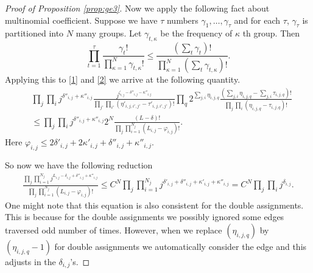 \documentclass[12pt]{article}
\numberwithin{equation}{section}
\numberwithin{equation}{section}
\theoremstyle{definition}
\renewcommand{\1}{\bf 1}
\begin{document}
\begin{proof}[Proof of Proposition \ref{prop:ge3}]
Now we apply the following fact about multinomial coefficient. Suppose we have $\tau$ numbers $\gamma_{1},\ldots, \gamma_{\tau}$ and for each $\tau$, $\gamma_{\tau}$ is partitioned into $N$ many groups. Let $\gamma_{t,\kappa}$ be the frequency of $\kappa$ th group. Then 
\begin{equation}
\prod_{t=1}^{\tau}\frac{\gamma_{t}!}{\prod_{\kappa=1}^{N}\gamma_{t,\kappa}!}\le \frac{\left(\sum_{t}\gamma_{t}\right)!}{\prod_{\kappa=1}^{N}(\sum_{t}\gamma_{t,\kappa})!}.
\end{equation} 
Applying this to \eqref{1} and \eqref{2} we arrive at the following quantity.
\begin{equation}
\begin{split}
&\prod_{j}\prod_{i}j^{\delta''_{i,j}+\kappa''_{i,j}}\frac{j^{\zeta_{i,j}-\delta''_{i,j}-\kappa''_{i,j}}}{\prod_{j'}\prod_{i'} \left(\eta'_{i,j,i',j'}-\tau'_{i,j,i',j'}\right)!}\prod_{q}2^{\sum_{j,i}\eta_{i,j,q}} \frac{(\sum_{j,i}\eta_{i,j,q}-\sum_{j,i}\tau_{i,j,q})!}{\prod_{j}\prod_{i}\left(\eta_{i,j,q}-\tau_{i,j,q}\right)!}\\
& \le \prod_{j}\prod_{i} j^{\delta''_{i,j}+\kappa''_{i,j}} 2^{N} \frac{(L-\delta)!}{\prod_{j}\prod_{i=1}^{N_{j}}(L_{i,j}-\varphi_{i,j})!}.
\end{split}
\end{equation}
Here $\varphi_{i,j}\le 2\delta'_{i,j}+ 2\kappa'_{i,j}+ \delta''_{i,j}+\kappa''_{i,j}$.

So now we have the following reduction
\begin{equation}
\begin{split}
\frac{\prod_{j}\prod_{i=1}^{N_{j}} j^{L_{i,j}-\delta_{i,j}+ \delta''_{i,j}+\kappa''_{i,j}}}{\prod_{j}\prod_{i=1}^{N_{j}}(L_{i,j}-\varphi_{i,j})!}\le C^{N} \prod_{j}\prod_{i=1}^{N_{j}} j^{\delta'_{i,j}+\delta''_{i,j}+\kappa'_{i,j}+\kappa''_{i,j}}= C^{N}\prod_{j}\prod_{i} j^{\delta_{i,j}}. 
\end{split}
\end{equation}
One might note that this equation is also consistent for the double assignments. This is because for the double assignments we possibly ignored some edges traversed odd number of times. However, when we replace $(\eta_{i,j,q})$ by $(\eta_{i,j,q}-1)$ for double assignments we automatically consider the edge and this adjusts in the $\delta_{i,j}$'s.


\end{proof}
\end{document}
